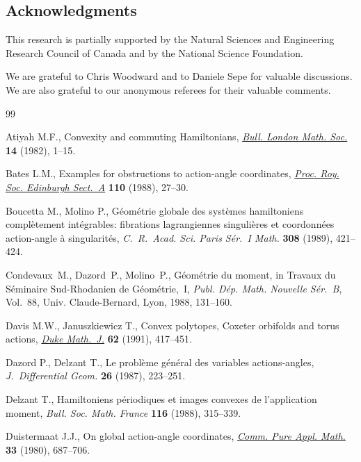 \documentclass[10pt,a4paper]{amsart}
\numberwithin{equation}{section}
\begin{document}
\subsection*{Acknowledgments}
This research is partially supported by the Natural Sciences
and Engineering Research Council of Canada  and by the National
Science Foundation.

We are grateful to Chris Woodward and to Daniele Sepe
for valuable discussions.
We are also grateful to our anonymous referees for their valuable comments.


\begin{thebibliography}{99}
\footnotesize \itemsep=0pt

Atiyah M.F., Convexity and commuting {H}amiltonians, \href{http://dx.doi.org/10.1112/blms/14.1.1}{\textit{Bull. London Math.
  Soc.}} \textbf{14} (1982), 1--15.

Bates L.M., Examples for obstructions to action-angle coordinates,
  \href{http://dx.doi.org/10.1017/S0308210500024823}{\textit{Proc. Roy. Soc. Edinburgh Sect.~A}} \textbf{110} (1988), 27--30.

Boucetta M., Molino P., G\'eom\'etrie globale des syst\`emes hamiltoniens
  compl\`etement int\'egrables: f\/ibrations lagrangiennes singuli\`eres et
  coordonn\'ees action-angle \`a singularit\'es, \textit{C.~R.~Acad. Sci. Paris
  S\'er.~I Math.} \textbf{308} (1989), 421--424.

Condevaux~M., Dazord~P.,  Molino~P.,
G\'eom\'etrie du moment,
in Travaux du {S}\'eminaire {S}ud-{R}hodanien de {G}\'eom\'etrie,~{I},
\textit{Publ. D\'ep. Math. Nouvelle S\'er.~B}, Vol.~88,
Univ. Claude-Bernard,
Lyon, 1988, 131--160.

Davis M.W., Januszkiewicz T., Convex polytopes, {C}oxeter orbifolds and torus
  actions, \href{http://dx.doi.org/10.1215/S0012-7094-91-06217-4}{\textit{Duke Math.~J.}} \textbf{62} (1991), 417--451.

Dazord P., Delzant T., Le probl\`eme g\'en\'eral des variables actions-angles,
  \textit{J.~Differential Geom.} \textbf{26} (1987), 223--251.

Delzant T., Hamiltoniens p\'eriodiques et images convexes de l'application
  moment, \textit{Bull. Soc. Math. France} \textbf{116} (1988), 315--339.

Duistermaat J.J., On global action-angle coordinates, \href{http://dx.doi.org/10.1002/cpa.3160330602}{\textit{Comm. Pure Appl.
  Math.}} \textbf{33} (1980), 687--706.


\end{thebibliography}
\end{document}
